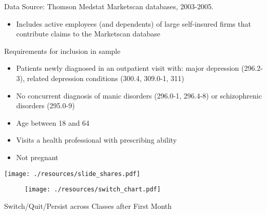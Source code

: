 
\begin{frame}{Data}
Source: Thomson Medstat Marketscan databases, 2003-2005.

\begin{itemize}
\item Includes active employees (and dependents) of large self-insured firms
that contribute claims to the Marketscan database
\end{itemize}

Requirements for inclusion in sample

\begin{itemize}
\item Patients newly diagnosed in an outpatient visit with: major depression
(296.2-3), related depression conditions (300.4, 309.0-1, 311)

\item No concurrent diagnosis of manic disorders (296.0-1, 296.4-8) or
schizophrenic disorders (295.0-9)

\item Age between 18 and 64

\item Visits a health professional with prescribing ability

\item Not pregnant
\end{itemize}
\end{frame}

\begin{frame}[plain]
\begin{center}
\texttt{[image: ./resources/slide\_shares.pdf]}
\end{center}
\end{frame}


\begin{frame}[plain]

\begin{figure}[h!]
\centering\texttt{[image: ./resources/switch\_chart.pdf]}
\end{figure}

Switch/Quit/Persist across Classes after First Month
\end{frame}


